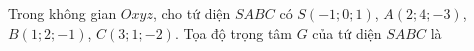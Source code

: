 \begin{ex}
Trong không gian $Oxyz$, cho tứ diện $SABC$ có $S(-1;0;1)$, $A(2;4;-3)$, $B(1;2;-1)$, $C(3;1;-2)$. Tọa độ trọng tâm $G$ của tứ diện $SABC$ là
\end{ex}
